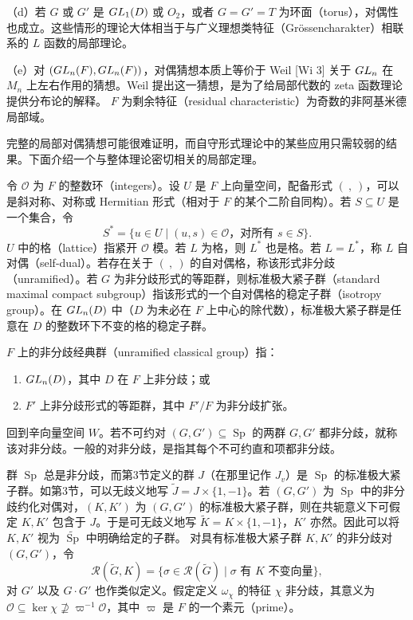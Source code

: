 （d）若 $G$ 或 $G'$ 是 $GL_1(D)$ 或 $O_2$，或者 $G=G'=T$ 为环面（torus），对偶性也成立。这些情形的理论大体相当于与广义理想类特征（Grössencharakter）相联系的 $L$ 函数的局部理论。

（e）对 $(GL_n(F),GL_n(F))$，对偶猜想本质上等价于 Weil [Wi 3] 关于 $GL_n$ 在 $M_n$ 上左右作用的猜想。Weil 提出这一猜想，是为了给局部代数的 zeta 函数理论提供分布论的解释。
$F$ 为剩余特征（residual characteristic）为奇数的非阿基米德局部域。

完整的局部对偶猜想可能很难证明，而自守形式理论中的某些应用只需较弱的结果。下面介绍一个与整体理论密切相关的局部定理。

令 $\mathcal O$ 为 $F$ 的整数环（integers）。设 $U$ 是 $F$ 上向量空间，配备形式 $(\ ,\ )$，可以是斜对称、对称或 Hermitian 形式（相对于 $F$ 的某个二阶自同构）。若 $S\subseteq U$ 是一个集合，令
\[
S^*=\{u\in U\mid(u,s)\in\mathcal O\text{，对所有 }s\in S\}.
\]
$U$ 中的格（lattice）指紧开 $\mathcal O$ 模。若 $L$ 为格，则 $L^*$ 也是格。若 $L=L^*$，称 $L$ 自对偶（self-dual）。若存在关于 $(\ ,\ )$ 的自对偶格，称该形式非分歧（unramified）。若 $G$ 为非分歧形式的等距群，则标准极大紧子群（standard maximal compact subgroup）指该形式的一个自对偶格的稳定子群（isotropy group）。在 $GL_n(D)$ 中（$D$ 为未必在 $F$ 上中心的除代数），标准极大紧子群是任意在 $D$ 的整数环下不变的格的稳定子群。

$F$ 上的非分歧经典群（unramified classical group）指：
\begin{enumerate}
\item[(i)] $GL_n(D)$，其中 $D$ 在 $F$ 上非分歧；或
\item[(ii)] $F'$ 上非分歧形式的等距群，其中 $F'/F$ 为非分歧扩张。
\end{enumerate}
回到辛向量空间 $W$。若不可约对 $(G,G')\subseteq\operatorname{Sp}$ 的两群 $G,G'$ 都非分歧，就称该对非分歧。一般的对非分歧，是指其每个不可约直和项都非分歧。

群 $\operatorname{Sp}$ 总是非分歧，而第3节定义的群 $J$（在那里记作 $J_v$）是 $\operatorname{Sp}$ 的标准极大紧子群。如第3节，可以无歧义地写 $\widetilde J=J\times\{1,-1\}$。若 $(G,G')$ 为 $\operatorname{Sp}$ 中的非分歧约化对偶对，$(K,K')$ 为 $(G,G')$ 的标准极大紧子群，则在共轭意义下可假定 $K,K'$ 包含于 $J$。于是可无歧义地写 $\widetilde K=K\times\{1,-1\}$，$K'$ 亦然。因此可以将 $K,K'$ 视为 $\widetilde{\operatorname{Sp}}$ 中明确给定的子群。
对具有标准极大紧子群 $K,K'$ 的非分歧对 $(G,G')$，令
\[
\mathcal R(\widetilde G,K)=\{\sigma\in\mathcal R(\widetilde G)\mid\sigma\text{ 有 }K\text{ 不变向量}\},
\]
对 $G'$ 以及 $G\cdot G'$ 也作类似定义。假定定义 $\omega_\chi$ 的特征 $\chi$ 非分歧，其意义为 $\mathcal O\subseteq\ker\chi\not\supseteq\varpi^{-1}\mathcal O$，其中 $\varpi$ 是 $F$ 的一个素元（prime）。

